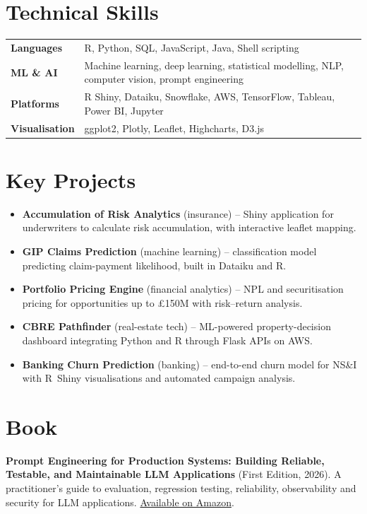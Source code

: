 \documentclass[a4paper,10pt]{article}
\begin{document}
\section{Technical Skills}
\begin{tabularx}{\textwidth}{@{}l X@{}}
  \textbf{Languages}     & R, Python, SQL, JavaScript, Java, Shell scripting\\
  \textbf{ML \& AI}      & Machine learning, deep learning, statistical modelling, NLP, computer vision, prompt engineering\\
  \textbf{Platforms}     & R Shiny, Dataiku, Snowflake, AWS, TensorFlow, Tableau, Power BI, Jupyter\\
  \textbf{Visualisation} & ggplot2, Plotly, Leaflet, Highcharts, D3.js\\
\end{tabularx}

\section{Key Projects}
\begin{itemize}
  \item \textbf{Accumulation of Risk Analytics} (insurance) -- Shiny application for underwriters to calculate risk accumulation, with interactive leaflet mapping.
  \item \textbf{GIP Claims Prediction} (machine learning) -- classification model predicting claim-payment likelihood, built in Dataiku and R.
  \item \textbf{Portfolio Pricing Engine} (financial analytics) -- NPL and securitisation pricing for opportunities up to \pounds150M with risk--return analysis.
  \item \textbf{CBRE Pathfinder} (real-estate tech) -- ML-powered property-decision dashboard integrating Python and R through Flask APIs on AWS.
  \item \textbf{Banking Churn Prediction} (banking) -- end-to-end churn model for NS\&I with R~Shiny visualisations and automated campaign analysis.
\end{itemize}

\newpage
\section{Book}
\textbf{Prompt Engineering for Production Systems: Building Reliable, Testable, and Maintainable LLM Applications} (First Edition, 2026).
A practitioner's guide to evaluation, regression testing, reliability, observability and security for LLM applications.
\href{https://www.amazon.co.uk/dp/B0HHY145SD}{\color{accent}Available on Amazon}.
\end{document}
